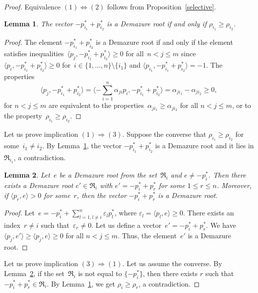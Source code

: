 \documentclass[a4paper,reqno,12pt]{amsart}
\def\epsilon{\varepsilon}
\newtheorem{lmm}{Lemma}
\theoremstyle{definition}
\begin{document}
\begin{proof}
  Equivalence $(1) \Leftrightarrow (2)$ follows from Proposition~\ref{selective}.

  \smallskip

  \begin{lmm}\label{compare}
    The vector $-p_{i_1}^*+p_{i_2}^*$ is a Demazure root if and only if $\rho_{i_1}\geq \rho_{i_2}$.
  \end{lmm}
  \begin{proof}
    The element ${-p_{i_1}^*+p_{i_2}^*}$ is a Demazure root if and only if the element satisfies inequalities~${\langle p_j, -p_{i_1}^*+p_{i_2}^* \rangle \geq 0}$ for all~$n < j \leq m$ since~${\langle p_i, -p_{i_1}^*+p_{i_2}^* \rangle \geq 0}$ for~${i \in \{1, \ldots, n\}\setminus \{i_1\}}$ and ${\langle p_{i_1}, -p_{i_1}^*+p_{i_2}^* \rangle = -1}$.
    The properties
    \[\langle p_j, -p_{i_1}^*+p_{i_2}^* \rangle = \langle -\sum\limits_{i=1}^n\alpha_{ji}p_i, -p_{i_1}^*+p_{i_2}^* \rangle = \alpha_{ji_1}-\alpha_{ji_2}\geq 0,\]
    for $n < j \leq m$ are equivalent to the properties~${\alpha_{ji_1} \geq \alpha_{ji_2}}$ for all $n < j \leq m$, or to the property~${\rho_{i_1}\geq \rho_{i_2}}$.
  \end{proof}

  Let us prove  implication $(1) \Rightarrow (3)$.
  Suppose the converse that $\rho_{i_1} \geq \rho_{i_2}$ for some~${i_1 \neq i_2}$.
  By Lemma~\ref{compare}, the vector $-p^*_{i_1}+p^*_{i_2}$ is a Demazure root and it lies in $\mathfrak R_{i_1}$, a contradiction.

  \smallskip

  \begin{lmm}\label{simple}
    Let~$e$ be a Demazure root from the set~${\mathfrak R_i}$ and ${e \neq -p_i^*}$.
    Then there exists a Demazure root $e' \in \mathfrak R_i$ with $e'=-p_i^*+p_r^*$ for some $1\leq r \leq n$.
    Moreover, if $\langle p_r, e \rangle > 0$ for some~$r$, then the vector $-p_i^*+p_r^*$ is a Demazure root.
  \end{lmm}
  \begin{proof}
    Let~${e=-p_i^*+\sum\limits_{l=1,l\neq i}^n \epsilon_l p_l^*}$, where ${\epsilon_l = \langle p_l, e \rangle\geq 0}$.
    There exists an index~${r\neq i}$ such that~${\epsilon_r\neq 0}$.
    Let us define  a vector~${e'=-p_i^*+p_r^*}$.
    We have ${\langle p_j, e'\rangle \geq \langle p_j, e \rangle \geq 0}$ for all ${n < j \leq m}$. Thus, the element~$e'$ is a Demazure root.

  \end{proof}
  Let us prove  implication $(3) \Rightarrow (1)$.
  Let us assume the converse.
  By Lemma~\ref{simple}, if the set~$\mathfrak{R}_i$ is not equal to $\{-p_i^*\}$, then there exists $r$ such that $-p_i^*+p_r^* \in \mathfrak{R}_i$.
  By Lemma~\ref{compare}, we get $\rho_{i}\geq \rho_{r}$, a contradiction.
  \smallskip
  

\end{proof}
\end{document}
